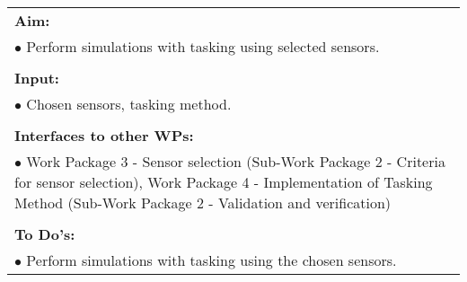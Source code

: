 \begin{table}[!h]
\begin{center}
\begin{tabular}{|p{35mm}||p{55mm}|p{50mm}||p{40mm}|}
      \hline\hline
      \multicolumn{4}{|p{150mm}|}{\textbf{Aim:}}                                                                                                                                                            \\
      \multicolumn{4}{|p{150mm}|}{$\bullet$ Perform simulations with tasking using selected sensors.}                                                   \\
      \multicolumn{4}{|p{150mm}|}{}                                                                                                                                                                           \\
      \multicolumn{4}{|p{150mm}|}{\textbf{Input:}}                                                                                                                                                            \\
      \multicolumn{4}{|p{150mm}|}{$\bullet$ Chosen sensors, tasking method.}                                                                                                                                 \\
      \multicolumn{4}{|p{150mm}|}{}                                                                                                                                                                           \\
      \multicolumn{4}{|p{150mm}|}{\textbf{Interfaces to other WPs:}}                                                                                                                                    \\
      \multicolumn{4}{|p{150mm}|}{$\bullet$ Work Package 3 - Sensor selection (Sub-Work Package 2 - Criteria for sensor selection), Work Package 4 - Implementation of Tasking Method (Sub-Work Package 2 - Validation and verification)}                                                                                              \\
      \multicolumn{4}{|p{150mm}|}{}                                                                                                                                                                           \\
      \multicolumn{4}{|p{150mm}|}{\textbf{To Do's:}}                                                                                                                                                         \\
      \multicolumn{4}{|p{150mm}|}{$\bullet$ Perform simulations with tasking using the chosen sensors.}\\

\end{tabular}
\end{center}
\end{table}
